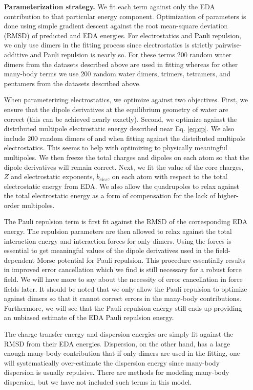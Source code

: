 \documentclass[journal=jctcce,manuscript=article]{achemso}
\begin{document}
\textbf{Parameterization strategy.} We fit each term against only the EDA contribution to that particular energy component. Optimization of parameters is done using simple gradient descent
against the root mean-square deviation (RMSD) of predicted and EDA energies. For electrostatics and Pauli repulsion, we only use dimers in
the fitting process since electrostatics is strictly pairwise-additive and Pauli repulsion is nearly so.
For these terms 200 random water dimers from the datasets
described above are used in fitting whereas for other many-body terms we use
200 random water dimers, trimers, tetramers, and pentamers from the datasets described above.

When parameterizing electrostatics, we optimize against two objectives. First, we ensure
that the dipole derivatives at the equilibrium geometry of water are correct (this can be achieved
nearly exactly). Second, we optimize against the distributed multipole electrostatic energy described
near Eq. \ref{eq:cp}. We also include 200 random dimers
of  and  when fitting against the distributed multipole electrostatics.
This seems to help with optimizing to physically meaningful multipoles.
We then freeze the total charges and dipoles on each atom so that the dipole derivatives
will remain correct. Next, we fit the value of the core charges, $Z$ and electrostatic exponents, $b_{elec}$, on each atom
with respect to the total electrostatic energy from EDA. We also allow the quadrupoles to relax
against the total electrostatic energy as a form of compensation for the lack of higher-order multipoles.

The Pauli repulsion term is first fit against the RMSD of the corresponding EDA energy.
The repulsion parameters are then allowed to relax against the total interaction energy
and interaction forces for only dimers. Using the forces is essential to get meaningful
values of the dipole derivatives used in the field-dependent Morse potential for Pauli
repulsion. This procedure essentially results in improved error cancellation
which we find is still necessary for a robust force field. We will have more to say about the necessity
of error cancellation in force fields later. It should be noted that we only allow
the Pauli repulsion to optimize against dimers so that it cannot correct errors
in the many-body contributions. Furthermore, we will see that the Pauli repulsion energy
still ends up providing an unbiased estimate of the EDA Pauli repulsion energy.

The charge transfer energy and dispersion energies are simply fit against the RMSD from their EDA energies. 
Dispersion, on the other hand, has a large enough many-body contribution that if only dimers
are used in the fitting, one will systematically over-estimate the dispersion energy since
many-body dispersion is usually repulsive. There are methods for modeling many-body dispersion,
but we have not included such terms in this model.\cite{anatole2010two,van2018new} 
\end{document}
